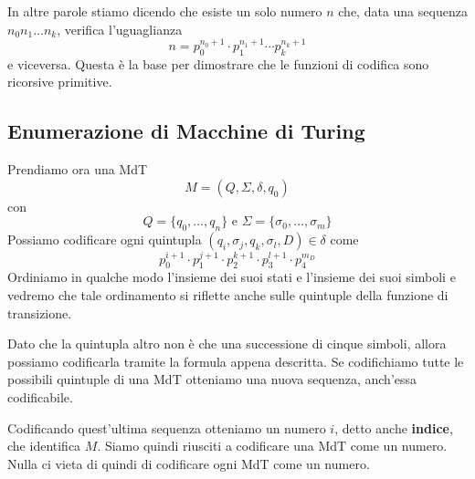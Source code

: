 In altre parole stiamo dicendo che esiste un solo numero $n$
che, data una sequenza $n_0 n_1 \dots n_k$, verifica
l'uguaglianza
\[
	n = p_0^{n_0 + 1} \cdot p_1^{n_1 + 1} \cdots
	p_k^{n_k + 1}
\]
e viceversa. Questa è la base per dimostrare che le funzioni
di codifica sono ricorsive primitive.

\subsection{Enumerazione di Macchine di Turing}
\label{ssec: enum MdT}
Prendiamo ora una MdT
\[ M = (Q, \Sigma, \delta, q_0) \]
con
\[
	Q = \{ q_0, \dots, q_n \} \text { e }
	\Sigma = \{ \sigma_0, \dots, \sigma_m \}
\]
Possiamo codificare ogni quintupla
$(q_i, \sigma_j, q_k, \sigma_l, D) \in \delta$ come
\[
	p_0^{i+1} \cdot p_1^{j+1} \cdot
	p_2^{k+1} \cdot p_3^{l+1} \cdot p_4^{m_D}
\]
Ordiniamo in qualche modo l'insieme dei suoi stati e l'insieme
dei suoi simboli e vedremo che tale ordinamento si riflette
anche sulle quintuple della funzione di transizione.

Dato che la quintupla altro non è che una successione di cinque
simboli, allora possiamo codificarla tramite la formula appena
descritta. Se codifichiamo tutte le possibili quintuple di una
MdT otteniamo una nuova sequenza, anch'essa codificabile.

Codificando quest'ultima sequenza otteniamo un numero $i$,
detto anche \textbf{indice}, che identifica $M$. Siamo quindi
riusciti a codificare una MdT come un numero. Nulla ci vieta
di quindi di codificare ogni MdT come un numero.

